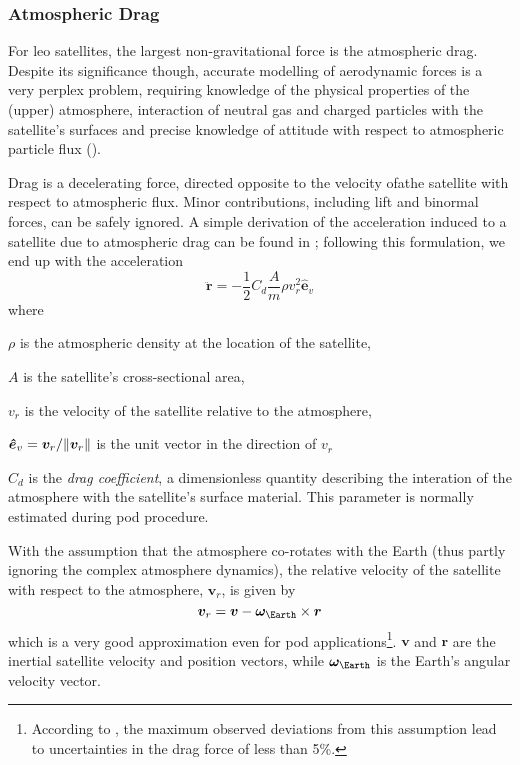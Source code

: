 \subsubsection{Atmospheric Drag}\label{sssec:atmospheric-drag}

For \gls{leo} satellites, the largest non-gravitational force is the atmospheric 
drag. Despite its significance though, accurate modelling of aerodynamic forces 
is a very perplex problem, requiring knowledge of the physical properties of the 
(upper) atmosphere, interaction of neutral gas and charged particles with the satellite's 
surfaces and precise knowledge of attitude with respect to atmospheric particle 
flux (\cite{Montenbruck2000}).

Drag is a decelerating force, directed opposite to the velocity ofathe satellite 
with respect to atmospheric flux. Minor contributions, including lift and binormal 
forces, can be safely ignored. A simple derivation of the acceleration induced 
to a satellite due to atmospheric drag can be found in \cite{Montenbruck2000}; 
following this formulation, we end up with the acceleration
\begin{equation}\label{eq:mont397}
  \bm{\ddot{r}} = -\frac{1}{2} C_{d} \frac{A}{m} \rho v_{r}^{2} \bm{\hat{e}}_v
\end{equation}
where
\begin{description}
  \item $\rho$ is the atmospheric density at the location of the satellite,
  \item $A$ is the satellite's cross-sectional area,
  \item $v_r$ is the velocity of the satellite relative to the atmosphere,
  \item $\bm{\hat{e}}_v = \bm{v}_r / \lVert\bm{v}_r\rVert$ is the unit vector in the 
    direction of $v_r$
  \item $C_d$ is the \emph{drag coefficient}, a dimensionless quantity describing the 
    interation of the atmosphere with the satellite's surface material. This parameter 
    is normally estimated during \gls{pod} procedure.
\end{description}

With the assumption that the atmosphere co-rotates with the Earth (thus partly 
ignoring the complex atmosphere dynamics), the relative velocity of the satellite 
with respect to the atmosphere, $\bm{v}_r$, is given by
\begin{equation}
  \bm{v}_r = \bm{v} - \bm{\omega}_{\Earth} \times \bm{r}
\end{equation}
which is a very good approximation even for \gls{pod} applications\footnote{According 
to \cite{Montenbruck2000}, the maximum observed deviations from this assumption 
lead to uncertainties in the drag force of less than 5\%.}. $\bm{v}$ and $\bm{r}$ 
are the inertial satellite velocity and position vectors, while 
$\bm{\omega}_{\Earth}$ is the Earth's angular velocity vector.

